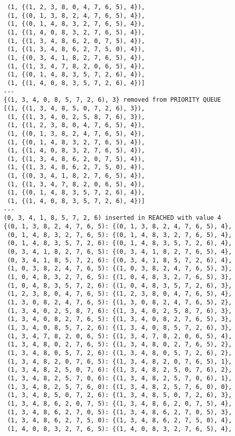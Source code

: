 \documentclass{article}
\begin{document}
\begin{verbatim}
 (1, {(1, 2, 3, 8, 0, 4, 7, 6, 5), 4}),
 (1, {(0, 1, 3, 8, 2, 4, 7, 6, 5), 4}),
 (1, {(0, 1, 4, 8, 3, 2, 7, 6, 5), 4}),
 (1, {(1, 4, 0, 8, 3, 2, 7, 6, 5), 4}),
 (1, {(1, 3, 4, 8, 6, 2, 0, 7, 5), 4}),
 (1, {(1, 3, 4, 8, 6, 2, 7, 5, 0), 4}),
 (1, {(0, 3, 4, 1, 8, 2, 7, 6, 5), 4}),
 (1, {(1, 3, 4, 7, 8, 2, 0, 6, 5), 4}),
 (1, {(0, 1, 4, 8, 3, 5, 7, 2, 6), 4}),
 (1, {(1, 4, 0, 8, 3, 5, 7, 2, 6), 4})]
---
{(1, 3, 4, 0, 8, 5, 7, 2, 6), 3} removed from PRIORITY QUEUE
[(1, {(1, 3, 4, 8, 5, 0, 7, 2, 6), 3}),
 (1, {(1, 3, 4, 0, 2, 5, 8, 7, 6), 3}),
 (1, {(1, 2, 3, 8, 0, 4, 7, 6, 5), 4}),
 (1, {(0, 1, 3, 8, 2, 4, 7, 6, 5), 4}),
 (1, {(0, 1, 4, 8, 3, 2, 7, 6, 5), 4}),
 (1, {(1, 4, 0, 8, 3, 2, 7, 6, 5), 4}),
 (1, {(1, 3, 4, 8, 6, 2, 0, 7, 5), 4}),
 (1, {(1, 3, 4, 8, 6, 2, 7, 5, 0), 4}),
 (1, {(0, 3, 4, 1, 8, 2, 7, 6, 5), 4}),
 (1, {(1, 3, 4, 7, 8, 2, 0, 6, 5), 4}),
 (1, {(0, 1, 4, 8, 3, 5, 7, 2, 6), 4}),
 (1, {(1, 4, 0, 8, 3, 5, 7, 2, 6), 4})]
---
(0, 3, 4, 1, 8, 5, 7, 2, 6) inserted in REACHED with value 4
{(0, 1, 3, 8, 2, 4, 7, 6, 5): {(0, 1, 3, 8, 2, 4, 7, 6, 5), 4},
 (0, 1, 4, 8, 3, 2, 7, 6, 5): {(0, 1, 4, 8, 3, 2, 7, 6, 5), 4},
 (0, 1, 4, 8, 3, 5, 7, 2, 6): {(0, 1, 4, 8, 3, 5, 7, 2, 6), 4},
 (0, 3, 4, 1, 8, 2, 7, 6, 5): {(0, 3, 4, 1, 8, 2, 7, 6, 5), 4},
 (0, 3, 4, 1, 8, 5, 7, 2, 6): {(0, 3, 4, 1, 8, 5, 7, 2, 6), 4},
 (1, 0, 3, 8, 2, 4, 7, 6, 5): {(1, 0, 3, 8, 2, 4, 7, 6, 5), 3},
 (1, 0, 4, 8, 3, 2, 7, 6, 5): {(1, 0, 4, 8, 3, 2, 7, 6, 5), 3},
 (1, 0, 4, 8, 3, 5, 7, 2, 6): {(1, 0, 4, 8, 3, 5, 7, 2, 6), 3},
 (1, 2, 3, 8, 0, 4, 7, 6, 5): {(1, 2, 3, 8, 0, 4, 7, 6, 5), 4},
 (1, 3, 0, 8, 2, 4, 7, 6, 5): {(1, 3, 0, 8, 2, 4, 7, 6, 5), 2},
 (1, 3, 4, 0, 2, 5, 8, 7, 6): {(1, 3, 4, 0, 2, 5, 8, 7, 6), 3},
 (1, 3, 4, 0, 8, 2, 7, 6, 5): {(1, 3, 4, 0, 8, 2, 7, 6, 5), 3},
 (1, 3, 4, 0, 8, 5, 7, 2, 6): {(1, 3, 4, 0, 8, 5, 7, 2, 6), 3},
 (1, 3, 4, 7, 8, 2, 0, 6, 5): {(1, 3, 4, 7, 8, 2, 0, 6, 5), 4},
 (1, 3, 4, 8, 0, 2, 7, 6, 5): {(1, 3, 4, 8, 0, 2, 7, 6, 5), 2},
 (1, 3, 4, 8, 0, 5, 7, 2, 6): {(1, 3, 4, 8, 0, 5, 7, 2, 6), 2},
 (1, 3, 4, 8, 2, 0, 7, 6, 5): {(1, 3, 4, 8, 2, 0, 7, 6, 5), 1},
 (1, 3, 4, 8, 2, 5, 0, 7, 6): {(1, 3, 4, 8, 2, 5, 0, 7, 6), 2},
 (1, 3, 4, 8, 2, 5, 7, 0, 6): {(1, 3, 4, 8, 2, 5, 7, 0, 6), 1},
 (1, 3, 4, 8, 2, 5, 7, 6, 0): {(1, 3, 4, 8, 2, 5, 7, 6, 0), 0},
 (1, 3, 4, 8, 5, 0, 7, 2, 6): {(1, 3, 4, 8, 5, 0, 7, 2, 6), 3},
 (1, 3, 4, 8, 6, 2, 0, 7, 5): {(1, 3, 4, 8, 6, 2, 0, 7, 5), 4},
 (1, 3, 4, 8, 6, 2, 7, 0, 5): {(1, 3, 4, 8, 6, 2, 7, 0, 5), 3},
 (1, 3, 4, 8, 6, 2, 7, 5, 0): {(1, 3, 4, 8, 6, 2, 7, 5, 0), 4},
 (1, 4, 0, 8, 3, 2, 7, 6, 5): {(1, 4, 0, 8, 3, 2, 7, 6, 5), 4},

\end{verbatim}
\end{document}
